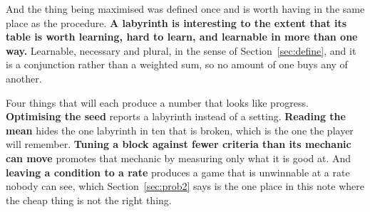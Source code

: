 \documentclass[11pt,a4paper]{article}
\begin{document}
\begin{sectionbox}
And the thing being maximised was defined once and is worth having in the same place as the
procedure. \textbf{A labyrinth is interesting to the extent that its table is worth learning, hard
to learn, and learnable in more than one way.} Learnable, necessary and plural, in the sense of
Section~\ref{sec:define}, and it is a conjunction rather than a weighted sum, so no amount of one
buys any of another.
\end{sectionbox}

\begin{alarmbox}
Four things that will each produce a number that looks like progress. \textbf{Optimising the seed}
reports a labyrinth instead of a setting. \textbf{Reading the mean} hides the one labyrinth in ten
that is broken, which is the one the player will remember. \textbf{Tuning a block against fewer
criteria than its mechanic can move} promotes that mechanic by measuring only what it is good at.
And \textbf{leaving a condition to a rate} produces a game that is unwinnable at a rate nobody can
see, which Section~\ref{sec:prob2} says is the one place in this note where the cheap thing is not
the right thing.
\end{alarmbox}
\end{document}
